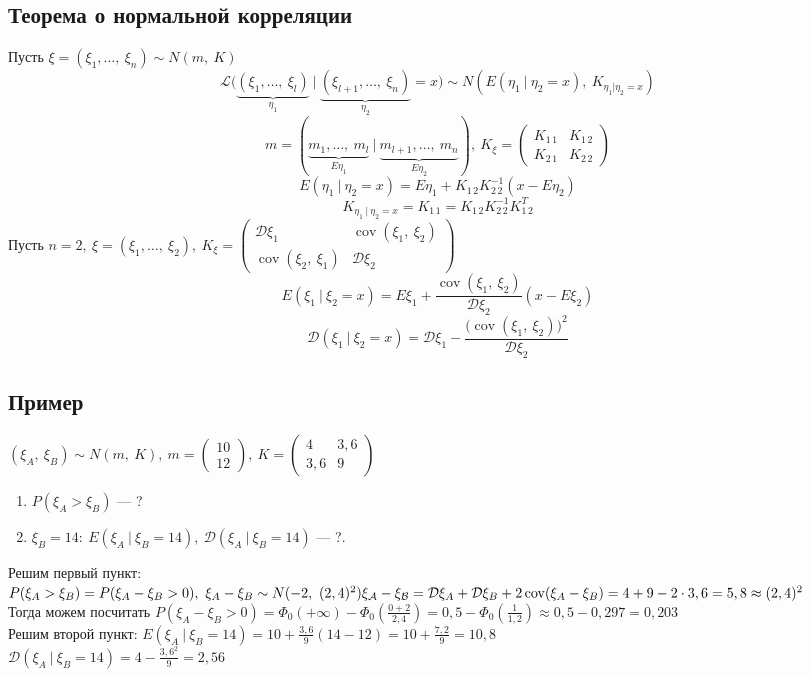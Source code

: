 \documentclass[12pt, a4paper]{article}
\begin{document}
    \subsection*{Теорема о нормальной корреляции}
    Пусть $\xi = (\xi_1,\dots,\ \xi_n)\sim N(m,\ K)$
    \[\mathcal{L}\big( \underset{\eta_1}{\underbrace{(\xi_1,\dots,\ \xi_l)}}\ |\ \underset{\eta_2}{\underbrace{(\xi_{l + 1},\dots,\ \xi_{n})}} = x \big)\sim N(E(\eta_1\ |\ \eta_2 = x),\ K_{\eta_1 | \eta_2 = x})\]
    \[m = (\underset{E\eta_1}{\underbrace{m_1,\dots,\ m_l}}\ |\ \underset{E\eta_2}{\underbrace{m_{l + 1},\dots,\ m_n}}),\ K_{\xi} = \begin{pmatrix}
        K_{1\, 1} & K_{1\, 2}\\
        K_{2\, 1} & K_{2\, 2}
    \end{pmatrix}\]
    \[E(\eta_1\ |\ \eta_2 = x) = E\eta_1 + K_{1\, 2}K^{-1}_{2\, 2}(x - E\eta_2)\]
    \[K_{\eta_1\ |\ \eta_2 = x} = K_{1\, 1} = K_{1\, 2}K_{2\, 2}^{-1} K_{1\, 2}^{T}\]
    Пусть $n = 2,\ \xi = (\xi_1,\dots,\ \xi_2),\ K_{\xi} = \begin{pmatrix}
        \mathcal{D}\xi_1 & \operatorname{cov}(\xi_1,\ \xi_2)\\
        \operatorname{cov}(\xi_2,\ \xi_1) & \mathcal{D}\xi_2
    \end{pmatrix}$
    \[E(\xi_1\ |\ \xi_2 = x) = E\xi_1 + \frac{\operatorname{cov}(\xi_1,\ \xi_2)}{\mathcal{D}\xi_2}(x - E\xi_2)\]
    \[\mathcal{D}(\xi_1\ |\ \xi_2 = x) = \mathcal{D}\xi_1 - \frac{\big(\operatorname{cov}(\xi_1,\ \xi_2)\big)^2}{\mathcal{D}\xi_2}\]
    \subsection*{Пример}
    $(\xi_A,\ \xi_B) \sim N(m,\ K),\ m = \begin{pmatrix}
        10\\
        12
    \end{pmatrix},\ K = \begin{pmatrix}
        4 & 3,6\\
        3,6 & 9
    \end{pmatrix}$
    \begin{enumerate}
        \item $P(\xi_A > \xi_B)$ --- ?
        \item $\xi_B = 14:\ E(\xi_A\ |\ \xi_B = 14),\ \mathcal{D}(\xi_A\ |\ \xi_B = 14)$ --- ?. 
    \end{enumerate}
    Решим первый пункт: $P(\xi_A > \xi_B) = P(\xi_A - \xi_B > 0),\ \xi_A - \xi_B \sim N(-2,\ (2,4)^2)\\
    \mathcal{\xi_A - \xi_B} = \mathcal{D}\xi_A + \mathcal{D}\xi_B + 2\operatorname{cov}(\xi_A - \xi_B) = 4 + 9 - 2\cdot3,6 = 5,8 \approx (2,4)^2$\\
    Тогда можем посчитать $P(\xi_A - \xi_B > 0) = \Phi_0(+\infty) - \Phi_0(\frac{0 + 2}{2,4}) = 0,5 - \Phi_0(\frac{1}{1,2}) \approx 0,5 - 0,297 = 0,203$\\
    Решим второй пункт: $E(\xi_A\ |\ \xi_B = 14) = 10 + \frac{3,6}{9}(14 - 12) = 10 + \frac{7,2}{9} = 10,8$\\
    $\mathcal{D}(\xi_A\ |\ \xi_B = 14) = 4 - \frac{3,6^2}{9} = 2,56$
\end{document}
